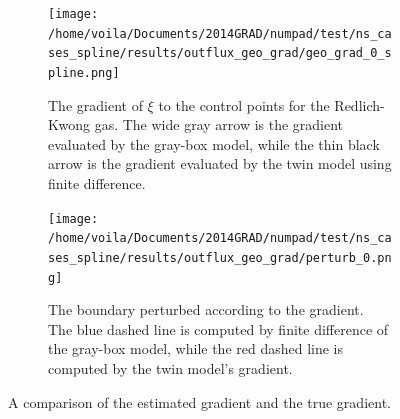 \begin{figure}[htbp]\begin{center}
    \begin{subfigure}[t]{.45\textwidth}
        \centering
        \texttt{[image: /home/voila/Documents/2014GRAD/numpad/test/ns\_cases\_spline/results/outflux\_geo\_grad/geo\_grad\_0\_spline.png]}
        \caption{
        The gradient of $\xi$ to the control points for the 
        Redlich-Kwong gas. 
        The wide gray arrow is the gradient evaluated by the gray-box model, while
        the thin black arrow is the gradient evaluated by the twin model using finite difference.
        }
        \label{fig: geo grad}
    \end{subfigure}
    \hspace{.5cm}
    \begin{subfigure}[t]{.45\textwidth}
        \centering
        \texttt{[image: /home/voila/Documents/2014GRAD/numpad/test/ns\_cases\_spline/results/outflux\_geo\_grad/perturb\_0.png]}
        \caption{
        The boundary perturbed according to the gradient. 
        The blue dashed line is computed by finite difference of the gray-box model, while the
        red dashed line is computed by the twin model's gradient.
        }
        \label{fig: geo grad perturb}
    \end{subfigure}
    \caption{A comparison of the estimated gradient and the true gradient.}
    \label{fig: geo grad all}
\end{center}\end{figure}

